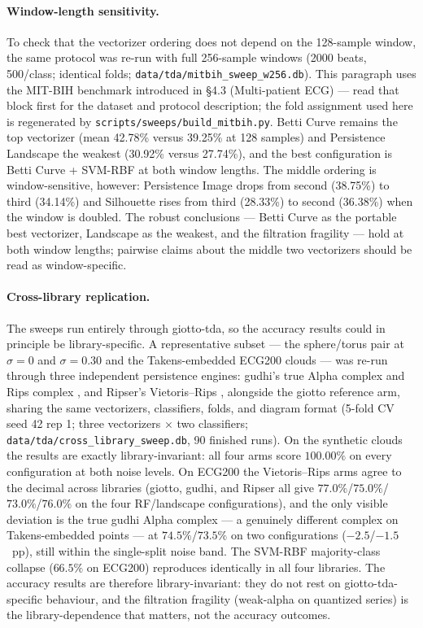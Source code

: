 \documentclass[12pt, a4paper]{report}
\theoremstyle{definition}
\theoremstyle{plain}
\theoremstyle{remark}
\begin{document}
\paragraph{Window-length sensitivity.} To check that the vectorizer
ordering does not depend on the 128-sample window, the same protocol
was re-run with full 256-sample windows (2000 beats, 500/class;
identical folds; \texttt{data/tda/mitbih\_sweep\_w256.db}). This
paragraph uses the MIT-BIH benchmark introduced in \S4.3
(Multi-patient ECG) --- read that block first for the dataset and
protocol description; the fold assignment used here is regenerated by
\texttt{scripts/sweeps/build\_mitbih.py}.
Betti Curve remains the top vectorizer (mean 42.78\% versus
39.25\% at 128 samples) and Persistence Landscape the weakest
(30.92\% versus 27.74\%), and the best configuration is
Betti Curve + SVM-RBF at both window lengths. The middle ordering is
window-sensitive, however: Persistence Image drops from second
(38.75\%) to third (34.14\%) and Silhouette rises from third
(28.33\%) to second (36.38\%) when the window is doubled. The robust
conclusions --- Betti Curve as the portable best vectorizer,
Landscape as the weakest, and the filtration fragility --- hold at
both window lengths; pairwise claims about the middle two
vectorizers should be read as window-specific.

\paragraph{Cross-library replication.} The sweeps run
entirely through giotto-tda, so the accuracy results could in
principle be library-specific. A representative subset --- the
sphere/torus pair at $\sigma{=}0$ and $\sigma{=}0.30$ and the
Takens-embedded ECG200 clouds --- was re-run through three
independent persistence engines: gudhi's true Alpha complex and Rips
complex \cite{maria2014}, and Ripser's Vietoris--Rips \cite{bauer2021}, alongside the giotto reference
arm, sharing the same vectorizers, classifiers, folds, and diagram
format (5-fold CV seed 42 rep 1; three vectorizers $\times$ two
classifiers;
\texttt{data/tda/cross\_library\_sweep.db}, 90 finished runs). On the
synthetic clouds the results are exactly library-invariant: all four
arms score $100.00\%$ on every configuration at both noise levels. On
ECG200 the Vietoris--Rips arms agree to the decimal across libraries
(giotto, gudhi, and Ripser all give $77.0\%$/$75.0\%$/$73.0\%$/$76.0\%$
on the four RF/landscape configurations), and the only visible
deviation is the true gudhi Alpha complex --- a genuinely different
complex on Takens-embedded points --- at $74.5\%$/$73.5\%$ on two
configurations ($-2.5$/$-1.5$~pp), still within the single-split noise
band. The SVM-RBF majority-class collapse ($66.5\%$ on ECG200)
reproduces identically in all four libraries. The accuracy results are
therefore library-invariant: they do not rest on giotto-tda-specific
behaviour, and the filtration fragility
(weak-alpha on quantized series) is the library-dependence that
matters, not the accuracy outcomes.
\end{document}
